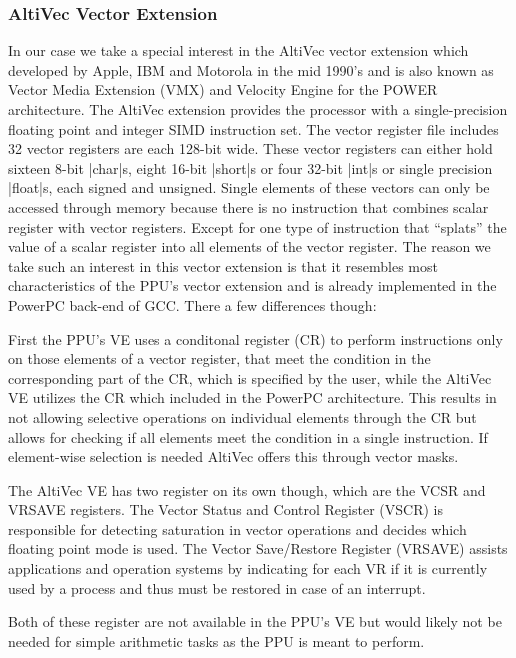 \subsubsection{AltiVec Vector Extension}
In our case we take a special interest in the AltiVec vector extension which developed by Apple, IBM and Motorola in the mid 1990's and is also known as Vector Media Extension (VMX) and Velocity Engine for the POWER architecture. 
The AltiVec extension provides the processor with a single-precision floating point and integer SIMD instruction set.
The vector register file includes 32 vector registers are each 128-bit wide. \cite{AV:registers}
These vector registers can either hold sixteen 8-bit |char|s, eight 16-bit |short|s or four 32-bit |int|s or single precision |float|s, each signed and unsigned.
Single elements of these vectors can only be accessed through memory because there is no instruction that combines scalar register with vector registers.
Except for one type of instruction that ``splats'' the value of a scalar register into all elements of the vector register.
The reason we take such an interest in this vector extension is that it resembles most characteristics of the PPU's vector extension and is already implemented in the PowerPC back-end of GCC.
There a few differences though:
\begin{addmargin}[2em]{0em}
    First the PPU's VE uses a conditonal register (CR) to perform instructions only on those elements of a vector register, that meet the condition in the corresponding part of the CR, which is specified by the user, while the AltiVec VE utilizes the CR which included in the PowerPC architecture.
    This results in not allowing selective operations on individual elements through the CR but allows for checking if all elements meet the condition in a single instruction.
    If element-wise selection is needed AltiVec offers this through vector masks.
    
    The AltiVec VE has two register on its own though, which are the VCSR and VRSAVE registers.
            The Vector Status and Control Register (VSCR) is responsible for detecting saturation in vector operations and decides which floating point mode is used.
            The Vector Save/Restore Register (VRSAVE) assists applications and operation systems by indicating for each VR if it is currently used by a process and thus must be restored in case of an interrupt.
    
    Both of these register are not available in the PPU's VE but would likely not be needed for simple arithmetic tasks as the PPU is meant to perform.
\end{addmargin}


